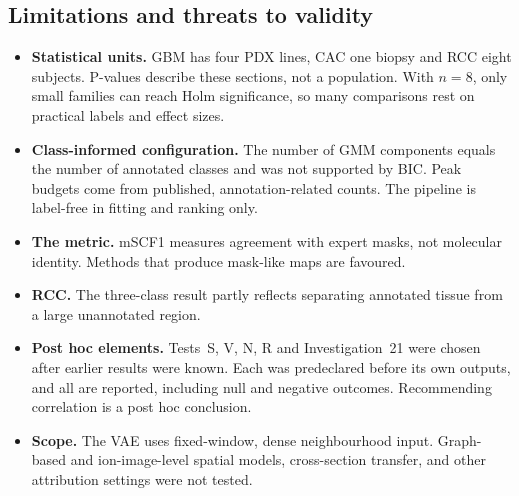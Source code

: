 \subsection{Limitations and threats to validity}
\begin{itemize}
  \item \textbf{Statistical units.} GBM has four PDX lines, CAC one biopsy and
        RCC eight subjects. P-values describe these sections, not a population.
        With $n=8$, only small families can reach Holm significance, so many
        comparisons rest on practical labels and effect sizes.
  \item \textbf{Class-informed configuration.} The number of GMM components
        equals the number of annotated classes and was not supported by BIC.
        Peak budgets come from published, annotation-related counts. The
        pipeline is label-free in fitting and ranking only.
  \item \textbf{The metric.} mSCF1 measures agreement with expert masks, not
        molecular identity. Methods that produce mask-like maps are favoured.
  \item \textbf{RCC.} The three-class result partly reflects separating
        annotated tissue from a large unannotated region.
  \item \textbf{Post hoc elements.} Tests~S, V, N, R and Investigation~21 were
        chosen after earlier results were known. Each was predeclared before its
        own outputs, and all are reported, including null and negative
        outcomes. Recommending correlation is a post hoc conclusion.
  \item \textbf{Scope.} The VAE uses fixed-window, dense neighbourhood input.
        Graph-based and ion-image-level spatial models, cross-section transfer,
        and other attribution settings were not tested.
\end{itemize}
